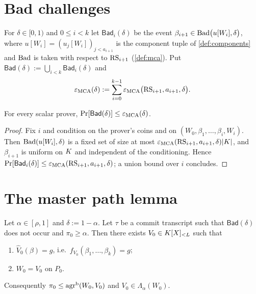 \section{Bad challenges}

\begin{definition}\label{def:bad-event}
For $\delta\in[0,1)$ and $0\le i<k$ let $\mathsf{Bad}_i(\delta)$ be the event
$\beta_{i+1}\in\mathrm{Bad}\bigl(u[W_i],\delta\bigr)$, where $u[W_i]=(u_j[W_i])_{j<a_{i+1}}$ is the
component tuple of \cref{def:components} and $\mathrm{Bad}$ is taken with respect to $\mathrm{RS}_{i+1}$
(\cref{def:mca}). Put $\mathsf{Bad}(\delta):=\bigcup_{i<k}\mathsf{Bad}_i(\delta)$ and
\[
\varepsilon_{\mathrm{MCA}}(\delta):=\sum_{i=0}^{k-1}\varepsilon_{\mathrm{MCA}}\bigl(\mathrm{RS}_{i+1},a_{i+1},\delta\bigr).
\]
\end{definition}

\begin{lemma}\label{lem:bad-prob}
For every scalar prover, $\Pr[\mathsf{Bad}(\delta)]\le\varepsilon_{\mathrm{MCA}}(\delta)$.
\end{lemma}

\begin{proof}
Fix $i$ and condition on the prover's coins and on $(W_0,\beta_1,\dots,\beta_i,W_i)$.
Then $\mathrm{Bad}(u[W_i],\delta)$ is a fixed set of size at most
$\varepsilon_{\mathrm{MCA}}(\mathrm{RS}_{i+1},a_{i+1},\delta)|K|$, and $\beta_{i+1}$ is uniform on $K$ and
independent of the conditioning. Hence
$\Pr[\mathsf{Bad}_i(\delta)]\le\varepsilon_{\mathrm{MCA}}(\mathrm{RS}_{i+1},a_{i+1},\delta)$; a union bound over
$i$ concludes.
\end{proof}

\section{The master path lemma}

\begin{lemma}\label{lem:master}
Let $\alpha\in[\rho,1]$ and $\delta:=1-\alpha$. Let $\tau$ be a commit transcript such
that $\mathsf{Bad}(\delta)$ does not occur and $\pi_0\ge\alpha$. Then there exists
$V_0\in K[X]_{<L}$ such that
\begin{enumerate}[label=\textup{(\roman*)}]
\item $\widehat V_0(\beta)=g$, i.e.\ $f_{V_0}(\beta_1,\dots,\beta_k)=g$;
\item $W_0=V_0$ on $P_0$.
\end{enumerate}
Consequently $\pi_0\le\mathrm{agr}^{\mathrm{b}}(W_0,V_0)$ and $V_0\in\Lambda_\alpha(W_0)$.
\end{lemma}

